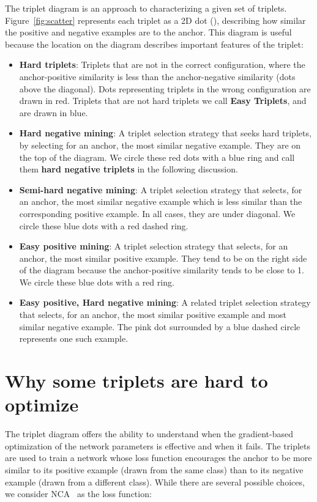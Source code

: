 \documentclass[runningheads]{llncs}
\begin{document}
The triplet diagram is an approach to characterizing a given set of triplets. Figure~\ref{fig:scatter} represents each triplet as a 2D dot (), describing how similar the positive and negative examples are to the anchor.  This diagram is useful because the location on the diagram describes important features of the triplet:
\begin{itemize}
    
    \item \textbf{Hard triplets}: Triplets that are not in the correct configuration, where the anchor-positive similarity is less   than the anchor-negative similarity (dots above the  diagonal). Dots representing triplets in the wrong configuration are drawn in red.  Triplets that are not hard triplets we call \textbf{Easy Triplets}, and are drawn in blue.

    \item \textbf{Hard negative mining}: A triplet selection strategy that seeks hard triplets, by selecting for an anchor, the most similar negative example.  They are on the top of the diagram.  We circle these red dots with a blue ring and call them \textbf{hard negative triplets} in the following discussion.
    
    \item \textbf{Semi-hard negative mining}\cite{facenet}: A triplet selection strategy that selects, for an anchor, the most similar negative example which is less similar than the corresponding positive example. In all cases, they are under  diagonal.  We circle these blue dots with a red dashed ring.
    
    \item \textbf{Easy positive mining}\cite{xuan2019improved}: A triplet selection strategy that selects, for an anchor, the most similar positive example. They tend to be on the right side of the diagram because the anchor-positive similarity tends to be close to 1. We circle these blue dots with a red ring.
    
    \item \textbf{Easy positive, Hard negative mining}\cite{xuan2019improved}: A related triplet selection strategy that selects, for an anchor, the most similar positive example and most similar negative example. The pink dot surrounded by a blue dashed circle represents one such example.

\end{itemize}


\section{Why some triplets are hard to optimize}
The triplet diagram offers the ability to understand when the gradient-based optimization of the network parameters is effective and when it fails. The triplets are used to train a network whose loss function encourages the anchor to be more similar to its positive example (drawn from the same class) than to its negative example (drawn from a different class).  While there are several possible choices, we consider NCA~\cite{nca} as the loss function:
\end{document}
